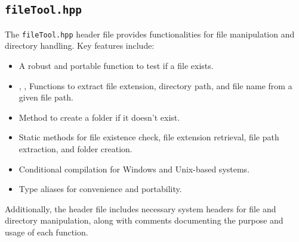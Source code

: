 \documentclass[a4paper,onecolumn,11pt]{doofus}
\begin{document}
\subsection{\texttt{fileTool.hpp}}

The \texttt{fileTool.hpp} header file provides functionalities for file manipulation and directory handling. Key features include:
%
\begin{itemize}
\item {} A robust and portable function to test if a file exists.
\item {}, ,  Functions to extract file extension, directory path, and file name from a given file path.
\item {} Method to create a folder if it doesn't exist.
\item Static methods for file existence check, file extension retrieval, file path extraction, and folder creation.
\item Conditional compilation for Windows and Unix-based systems.
\item Type aliases for convenience and portability.
\end{itemize}

Additionally, the header file includes necessary system headers for file and directory manipulation, along with comments documenting the purpose and usage of each function.




\end{document}
